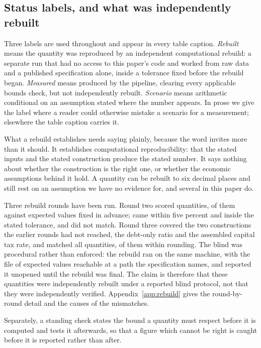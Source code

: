 \subsection{Status labels, and what was independently rebuilt}
\label{sec:rebuild}

Three labels are used throughout and appear in every table caption. \emph{Rebuilt} means the
quantity was reproduced by an independent computational rebuild: a separate run that had no access
to this paper's code and worked from raw data and a published specification alone, inside a
tolerance fixed before the rebuild began. \emph{Measured} means produced by the pipeline, clearing
every applicable bounds check, but not independently rebuilt. \emph{Scenario} means arithmetic
conditional on an assumption stated where the number appears. In prose we give the label where a
reader could otherwise mistake a scenario for a measurement; elsewhere the table caption carries
it.

What a rebuild establishes needs saying plainly, because the word invites more than it should. It
establishes computational reproducibility: that the stated inputs and the stated construction
produce the stated number. It says nothing about whether the construction is the right one, or
whether the economic assumptions behind it hold. A quantity can be rebuilt to six decimal places
and still rest on an assumption we have no evidence for, and several in this paper do.

Three rebuild rounds have been run. Round two scored  quantities,
 of them against expected values fixed in advance;
 came within five percent and  inside the stated
tolerance, and  did not match. Round three covered the two constructions
the earlier rounds had not reached, the debt-only ratio and the assembled capital tax rate, and
matched all  quantities,  of them within
rounding. The blind was procedural rather than enforced: the rebuild ran on the same machine, with
the file of expected values reachable at a path the specification names, and reported it unopened
until the rebuild was final. The claim is therefore that these quantities were independently
rebuilt under a reported blind protocol, not that they were independently verified.
Appendix~\ref{app:rebuild} gives the round-by-round detail and the causes of the mismatches.

Separately, a standing check states the bound a quantity must respect before it is computed and
tests it afterwards, so that a figure which cannot be right is caught before it is reported rather
than after.

